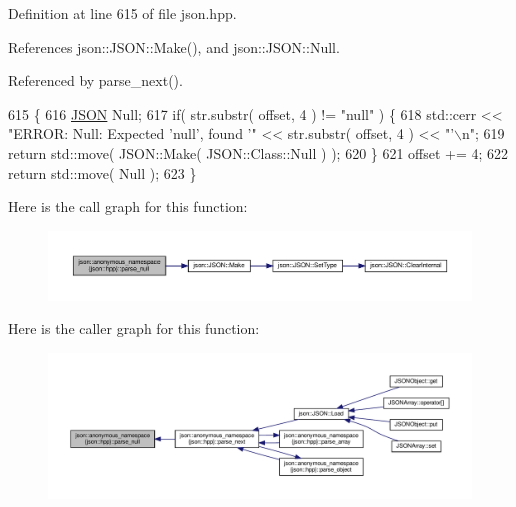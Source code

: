 Definition at line 615 of file json.\+hpp.



References json\+::\+J\+S\+O\+N\+::\+Make(), and json\+::\+J\+S\+O\+N\+::\+Null.



Referenced by parse\+\_\+next().


\begin{DoxyCode}
615                                                          \{
616         \mbox{\hyperlink{class_j_s_o_n}{JSON}} Null;
617         \textcolor{keywordflow}{if}( str.substr( offset, 4 ) != \textcolor{stringliteral}{"null"} ) \{
618             std::cerr << \textcolor{stringliteral}{"ERROR: Null: Expected 'null', found '"} << str.substr( offset, 4 ) << \textcolor{stringliteral}{"'\(\backslash\)n"};
619             \textcolor{keywordflow}{return} std::move( JSON::Make( JSON::Class::Null ) );
620         \}
621         offset += 4;
622         \textcolor{keywordflow}{return} std::move( Null );
623     \}
\end{DoxyCode}
Here is the call graph for this function\+:
\nopagebreak
\begin{figure}[H]
\begin{center}
\leavevmode
\includegraphics[width=350pt]{namespacejson_1_1anonymous__namespace_02json_8hpp_03_ad65e6ea0d2d880b099cf399600bf5666_cgraph}
\end{center}
\end{figure}
Here is the caller graph for this function\+:
\nopagebreak
\begin{figure}[H]
\begin{center}
\leavevmode
\includegraphics[width=350pt]{namespacejson_1_1anonymous__namespace_02json_8hpp_03_ad65e6ea0d2d880b099cf399600bf5666_icgraph}
\end{center}
\end{figure}
\mbox{\label{namespacejson_1_1anonymous__namespace_02json_8hpp_03_a9cc81652562c9d3c0f639ce43057f09a}} 
